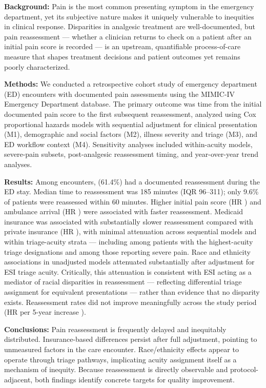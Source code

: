 \textbf{Background:}
Pain is the most common presenting symptom in the emergency department, yet its subjective nature makes it uniquely vulnerable to inequities in clinical response.
Disparities in analgesic treatment are well-documented, but pain reassessment --- whether a clinician returns to check on a patient after an initial pain score is recorded --- is an upstream, quantifiable process-of-care measure that shapes treatment decisions and patient outcomes yet remains poorly characterized.

\textbf{Methods:}
We conducted a retrospective cohort study of emergency department (ED) encounters with documented pain assessments using the MIMIC-IV Emergency Department database.
The primary outcome was time from the initial documented pain score to the first subsequent reassessment, analyzed using Cox proportional hazards models with sequential adjustment for clinical presentation (M1), demographic and social factors (M2), illness severity and triage (M3), and ED workflow context (M4).
Sensitivity analyses included within-acuity models, severe-pain subsets, post-analgesic reassessment timing, and year-over-year trend analyses.

\textbf{Results:}
Among \CohortN{} encounters, \CohortEvents{} (61.4\%) had a documented reassessment during the ED stay.
Median time to reassessment was 185 minutes (IQR 96--311); only 9.6\% of patients were reassessed within 60 minutes.
Higher initial pain score (HR \HRPainMfour{}) and ambulance arrival (HR \HRAmbulanceMfour{}) were associated with faster reassessment.
Medicaid insurance was associated with substantially slower reassessment compared with private insurance (HR \HRMedicaidMfour{}), with minimal attenuation across sequential models and within triage-acuity strata --- including among patients with the highest-acuity triage designations and among those reporting severe pain.
Race and ethnicity associations in unadjusted models attenuated substantially after adjustment for ESI triage acuity.
Critically, this attenuation is consistent with ESI acting as a mediator of racial disparities in reassessment --- reflecting differential triage assignment for equivalent presentations --- rather than evidence that no disparity exists.
Reassessment rates did not improve meaningfully across the study period (HR per 5-year increase \HRYearFive{}).

\textbf{Conclusions:}
Pain reassessment is frequently delayed and inequitably distributed.
Insurance-based differences persist after full adjustment, pointing to unmeasured factors in the care encounter.
Race/ethnicity effects appear to operate through triage pathways, implicating acuity assignment itself as a mechanism of inequity.
Because reassessment is directly observable and protocol-adjacent, both findings identify concrete targets for quality improvement.
